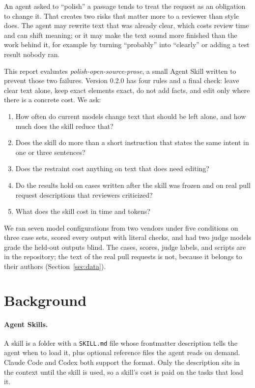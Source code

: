 \documentclass[11pt]{article}
\newcommand{\code}[1]{\texttt{#1}}
\begin{document}
An agent asked to ``polish'' a passage tends to treat the request as an obligation to
change it. That creates two risks that matter more to a reviewer than style does. The
agent may rewrite text that was already clear, which costs review time and can shift
meaning; or it may make the text sound more finished than the work behind it, for
example by turning ``probably'' into ``clearly'' or adding a test result nobody ran.

This report evaluates \emph{polish-open-source-prose}, a small Agent Skill written to
prevent those two failures. Version 0.2.0 has four rules and a final check: leave clear text alone, keep
exact elements exact, do not add facts, and edit only where there is a concrete cost. We
ask:

\begin{enumerate}[leftmargin=3.2em]
  \item[\textbf{RQ1}] How often do current models change text that should be left alone,
    and how much does the skill reduce that?
  \item[\textbf{RQ2}] Does the skill do more than a short instruction that states the same
    intent in one or three sentences?
  \item[\textbf{RQ3}] Does the restraint cost anything on text that does need editing?
  \item[\textbf{RQ4}] Do the results hold on cases written after the skill was frozen and
    on real pull request descriptions that reviewers criticized?
  \item[\textbf{RQ5}] What does the skill cost in time and tokens?
\end{enumerate}

We ran seven model configurations from two vendors under five conditions on three case
sets, scored every output with literal checks, and had two judge models grade the
held-out outputs blind. The cases, scores, judge labels, and scripts are in the
repository; the text of the real pull requests is not, because it belongs to their
authors (Section~\ref{sec:data}).

\section{Background}
\label{sec:reviewers}

\paragraph{Agent Skills.} A skill is a folder with a \code{SKILL.md} file whose
frontmatter description tells the agent when to load it, plus optional reference files
the agent reads on demand. Claude Code and Codex both support the format. Only the
description sits in the context until the skill is used, so a skill's cost is paid on
the tasks that load it.
\end{document}
